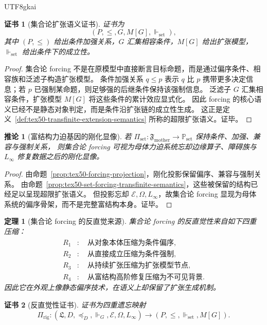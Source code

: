 \documentclass[12pt]{article}
\newtheorem{theorem}{定理}[section]
\newtheorem{corollary}{推论}[section]
\newtheorem{Certificate}{证书}[section]
\newcommand{\Law}{\mathfrak{L}}
\newcommand{\Linfty}{\ensuremath{L_\infty}}
\begin{document}
\begin{CJK*}{UTF8}{gkai}
\begin{Certificate}[集合论扩张语义证书]
证书为
\[
  (P,\le,G,M[G],\Vdash_{\mathrm{set}}),
\]
其中 $(P,\le)$ 给出条件加强关系，$G$ 汇集相容条件，$M[G]$ 给出扩张模型，
$\Vdash_{\mathrm{set}}$ 给出条件下的成立性。
\end{Certificate}

\begin{proof}
集合论 forcing 不是在原模型中直接断言目标命题，而是通过偏序条件、相容族和泛滤子构造扩张模型。
条件加强关系 $q\le p$ 表示 $q$ 比 $p$ 携带更多决定信息；若 $p$ 已强制某命题，则足够强的后继条件保持该强制信息。
泛滤子 $G$ 汇集相容条件，扩张模型 $M[G]$ 将这些条件的累计效应显式化。
因此 forcing 的核心语义已经不是静态对象判定，而是条件沿扩张链的成立性生成。
这正是定义~\ref{def:tex50-transfinite-extension-semantics} 所称的超限扩张语义。证毕。
\end{proof}

\begin{corollary}[富结构力迫基因的刚化显像]
\label{cor:tex50-rich-forcing-gene}
若 $\Pi_{\mathrm{set}}:\mathfrak F_{\mathrm{mother}}\to\mathbb P_{\mathrm{set}}$ 保持条件、加强、兼容与强制关系，
则集合论 forcing 可视为母体力迫系统忘却边缘算子、障碍族与 \Linfty{} 修复数据之后的刚化显像。
\end{corollary}

\begin{proof}
由命题~\ref{prop:tex50-forcing-projection}，刚化投影保留偏序、兼容与强制关系。
由命题~\ref{prop:tex50-set-forcing-transfinite-semantics}，这些被保留的结构已经足以呈现超限扩张语义。
但投影忘却 $\mathcal E,\Omega,\Linfty$，故集合论 forcing 显现为母体系统的偏序骨架，而不是完整富结构本身。证毕。
\end{proof}

\begin{theorem}[集合论 forcing 的反直觉来源]
\label{thm:tex50-forcing-counterintuitive}
集合论 forcing 的反直觉性来自如下四重压缩：
\[
\begin{aligned}
  R_1&:\quad \text{从对象本体压缩为条件偏序},\\
  R_2&:\quad \text{从直接成立压缩为条件强制},\\
  R_3&:\quad \text{从持续扩张压缩为扩张模型节点},\\
  R_4&:\quad \text{从富结构高阶修复压缩为不可见背景}.
\end{aligned}
\]
因此它在外观上像静态偏序技术，在语义上却保留了扩张生成机制。
\end{theorem}

\begin{Certificate}[反直觉性证书]
证书为四重遗忘映射
\[
  \Pi_{\mathrm{rig}}
  :
  (\Law,D,\preceq_D,\Vdash_G,\mathcal E,\Omega,\Linfty)
  \longrightarrow
  (P,\le,\Vdash_{\mathrm{set}},M[G]).
\]
\end{Certificate}


\end{CJK*}
\end{document}
